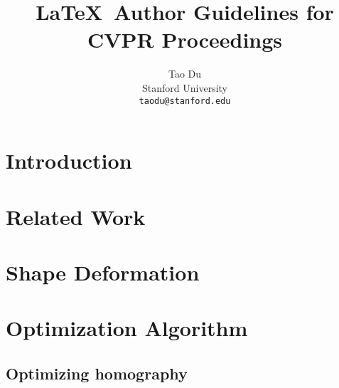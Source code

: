 \documentclass[10pt,twocolumn,letterpaper]{article}
\begin{document}
\title{\LaTeX\ Author Guidelines for CVPR Proceedings}

\author{Tao Du\\
Stanford University\\
{\tt\small taodu@stanford.edu}
}

\maketitle

\begin{abstract}
\end{abstract}

\section{Introduction}

\section{Related Work}

\section{Shape Deformation}

\section{Optimization Algorithm}

\subsection{Optimizing homography}
\end{document}
